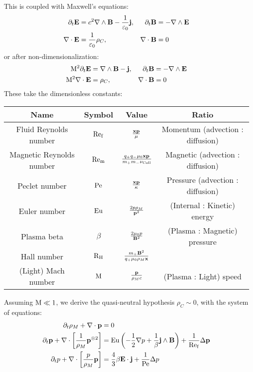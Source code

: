     This is coupled with Maxwell's equations:
    \begin{align*}
        \partial_{t}\mathbf{E}  &=  c^{2}\nabla\wedge\mathbf{B} - \frac{1}{\varepsilon_{0}}\mathbf{j},  &
        \partial_{t}\mathbf{B}  &=  - \nabla\wedge\mathbf{E}  \\
        \nabla\cdot\mathbf{E}  &=  \frac{1}{\varepsilon_{0}}\rho_{C},  &
        \nabla\cdot\mathbf{B}  &=  0
    \end{align*}
    or after non-dimensionalization:
    \begin{align*}
        \mathrm{M}^{2}\partial_{t}\mathbf{E}  &=  \nabla\wedge\mathbf{B} - \mathbf{j},  &
        \partial_{t}\mathbf{B}  &=  - \nabla\wedge\mathbf{E}  \\
        \mathrm{M}^{2}\nabla\cdot\mathbf{E}  &=  \rho_{C},  &
        \nabla\cdot\mathbf{B}  &=  0
    \end{align*}
    These take the dimensionless constants: 
    \begin{center}\begin{tabular}{ c c c c }
        Name  &  Symbol  &  Value  &  Ratio  \\
        \hline\hline
        Fluid Reynolds number  &  $\mathrm{Re}_{\mathrm{f}}$  &  $\frac{\mathbf{x}\mathbf{p}}{\mu}$  &  Momentum (advection : diffusion)  \\
        Magnetic Reynolds number  &  $\mathrm{Re}_{\mathrm{m}}$  &  $\frac{q_{+}q_{-}\mu_{0}\mathbf{x}\mathbf{p}}{m_{+}m_{-}\nu_{\rm Coll}}$  &  Magnetic (advection : diffusion)  \\
        Peclet number  &  $\mathrm{Pe}$  &  $\frac{\mathbf{x}\mathbf{p}}{\kappa}$  &  Pressure (advection : diffusion)  \\
        \hline
        Euler number  &  $\mathrm{Eu}$  &  $\frac{2p\rho_{M}}{\mathbf{p}^{2}}$  &  (Internal : Kinetic) energy  \\
        Plasma beta  &  $\beta$  &  $\frac{2\mu_{0}p}{\mathbf{B}^{2}}$  &  (Plasma : Magnetic) pressure  \\
        Hall number  &  $\mathrm{R}_{\mathrm{H}}$  &  $\frac{m_{+}\mathbf{B}^{2}}{q_{+}\mu_{0}\rho_{M}\mathbf{x}}$  &  \BA{??}  \\
        (Light) Mach number  &  $\mathrm{M}$  &  $\frac{\mathbf{p}}{\rho_{M}c}$  &  (Plasma : Light) speed
    \end{tabular}\end{center}
    Assuming $\mathrm{M}  \ll  1$, we derive the quasi-neutral hypothesis $\rho_{C}  \sim  0$, with the system of equations:
    \begin{align}
        \partial_{t}\rho_{M} + \nabla\cdot\mathbf{p}  &=  0  \label{eqn:mass conservation} 
         \\
        \partial_{t}\mathbf{p} + \nabla\cdot\left[\frac{1}{\rho_{M}}\mathbf{p}^{\otimes 2}\right]  &=  \mathrm{Eu}\left(- \frac{1}{2}\nabla p + \frac{1}{\beta}\mathbf{j}\wedge\mathbf{B}\right) + \frac{1}{\mathrm{Re}_{\mathrm{f}}}\Delta\mathbf{p}  \label{eqn:momentum conservation}  \\
        \partial_{t}p + \nabla\cdot\left[\frac{p}{\rho_{M}}\mathbf{p}\right]  &=  \frac{4}{3}\beta\mathbf{E}\cdot\mathbf{j} + \frac{1}{\mathrm{Pe}}\Delta p  \label{eqn:energy conservation}
    \end{align}
